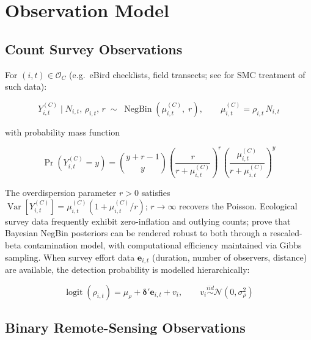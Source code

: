 \documentclass[12pt,a4paper]{article}
\theoremstyle{definition}
\newcommand{\Var}{\operatorname{Var}}
\newcommand{\N}{\mathcal{N}}
\newcommand{\NB}{\operatorname{NegBin}}
\newcommand{\bdelta}{\bm{\delta}}
\newcommand{\OC}{\mathcal{O}_C}
\begin{document}
\section{Observation Model}
\label{sec:obs}

\subsection{Count Survey Observations}

For $(i,t) \in \OC$ (e.g.\ eBird checklists, field transects;
see \citealt{adjei2024} for SMC treatment of such data):

\begin{equation}
  Y_{i,t}^{(C)} \;\Big|\; N_{i,t},\, \rho_{i,t},\, r
  \;\sim\; \NB\!\left(\mu_{i,t}^{(C)},\; r\right),
  \qquad \mu_{i,t}^{(C)} = \rho_{i,t}\, N_{i,t}
  \label{eq:obs-count}
\end{equation}

with probability mass function

\begin{equation}
  \Pr\!\left(Y_{i,t}^{(C)} = y\right)
  = \binom{y+r-1}{y}
    \!\left(\frac{r}{r + \mu_{i,t}^{(C)}}\right)^{\!r}
    \!\left(\frac{\mu_{i,t}^{(C)}}{r + \mu_{i,t}^{(C)}}\right)^{\!y}
  \label{eq:nb-pmf}
\end{equation}

The overdispersion parameter $r > 0$ satisfies
$\Var[Y_{i,t}^{(C)}] = \mu_{i,t}^{(C)}(1 + \mu_{i,t}^{(C)}/r)$;
$r \to \infty$ recovers the Poisson.
Ecological survey data frequently exhibit zero-inflation and outlying counts;
\citet{hamura2025} prove that Bayesian NegBin posteriors can be rendered robust
to both through a rescaled-beta contamination model, with computational efficiency
maintained via Gibbs sampling.
When survey effort data $\bm{e}_{i,t}$
(duration, number of observers, distance) are available, the detection
probability is modelled hierarchically:

\begin{equation}
  \operatorname{logit}(\rho_{i,t})
  = \mu_\rho + \bdelta'\bm{e}_{i,t} + v_i,
  \qquad
  v_i \stackrel{iid}{\sim} \N(0, \sigma_\rho^2)
  \label{eq:detection}
\end{equation}

\subsection{Binary Remote-Sensing Observations}
\end{document}

